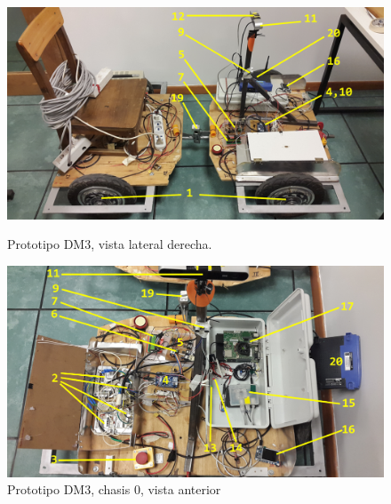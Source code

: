 \documentclass[withindex,glossary]{cam-thesis}
\begin{document}
\begin{figure}[H]
  \centering
  \begin{minipage}[b]{0.49\textwidth}
    \includegraphics[width=\textwidth]{images/Robot1}
    \caption[Prototipo DM3, vista lateral derecha.]{Prototipo DM3, vista lateral derecha.}
    \label{fig:PrototipoDM31}
  \end{minipage}
  \hfill
  \begin{minipage}[b]{0.49\textwidth}
    \includegraphics[width=\textwidth]{images/Robot2}
    \caption[Prototipo DM3, chasis 0, vista anterior]{Prototipo DM3, chasis 0, vista anterior}
    \label{fig:PrototipoDM32}
  \end{minipage}
\end{figure}
\end{document}
